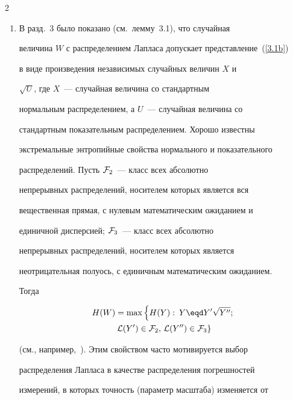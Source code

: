 \begin{multicols}{2}
\begin{enumerate}[1.]
случайная величина с распределением Лапласа $\Lambda(x)$, 


$$


H(W)=\max\big\{H(Y):\: {\cal L}(Y)\in{\cal F}_1\big\}


$$


(см., например,~\cite{41be}).


\item


В разд.~3 было показано (см.\ лемму~3.1), что случайная


величина $W$ с распределением Лапласа допускает представление~(\ref{3.1b})


в виде произведения независимых случайных величин $X$ и


$\sqrt{U}$, где $X$~--- случайная величина со стандартным


нормальным распределением, а $U$~--- случайная величина со


стандартным показательным распределением. Хорошо известны


экстремальные энтропийные свойства нормального и показательного


распределений. Пусть ${\cal F}_2$~--- класс всех абсолютно


непрерывных распределений, носителем которых является вся


вещественная прямая, с нулевым математическим ожиданием и


единичной дисперсией; ${\cal F}_3$~--- класс всех абсолютно


непрерывных распределений, носителем которых является


неотрицательная полуось, с единичным математическим ожиданием.


Тогда


\begin{multline*}


H(W)=\max\left \{ H(Y):\: Y\eqd Y'\sqrt{Y''};\right. \\


\left.{\cal


L}(Y')\in{\cal F}_2,\,{\cal L}(Y'')\in{\cal F}_3\right \}


\end{multline*}


(см., например,~\cite{41be}). Этим свойством часто мотивируется выбор


распределения Лапласа в качестве распределения погрешностей


измерений, в которых точность (параметр масштаба) изменяется от



\end{enumerate}
\end{multicols}
